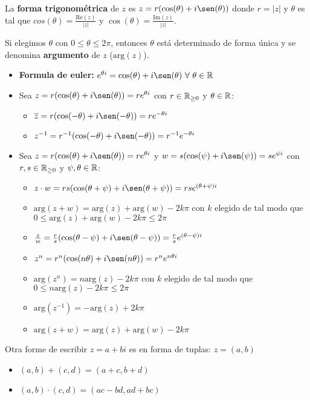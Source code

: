 La \textbf{forma trigonométrica} de $z$ es $\trigform{z}{r}{\theta}$ donde $r=|z|$ y $\theta$ es tal que $cos(\theta)=\frac{\text{Re}(z)}{|z|}$ y $\cos(\theta) = \frac{\text{Im}(z)}{|z|}$.

Si elegimos $\theta$ con $0\leq\theta\leq2\pi$, entonces $\theta$ está determinado de forma \'unica y se denomina \textbf{argumento} de $z$ ($\text{arg}(z)$).

\begin{itemize}
\item \textbf{Formula de euler:} $e^{\theta i} =  \cos(\theta) + i\sen(\theta) ~\forall~\theta\in\reales$
\item Sea $\trigform{z}{r}{\theta} = \eulerform{r}{\theta}$ con $r\in\mathbb{R}_{\geq 0}$ y $\theta\in\mathbb{R}$:
\begin{itemize}
\item $\trigform{\overline{z}}{r}{-\theta} = \eulerform{r}{-\theta}$
\item $\trigform{z^{-1}}{r^{-1}}{-\theta} = \eulerform{r^{-1}}{-\theta}$
\end{itemize}
\item Sea $\trigform{z}{r}{\theta} = \eulerform{r}{\theta}$ y $\trigform{w}{s}{\psi} = \eulerform{s}{\psi}$ con $r,s\in\mathbb{R}_{\geq 0}$ y $\psi,\theta\in\mathbb{R}$:
\begin{itemize}
    \item $\trigform{z\cdot w}{rs}{\theta+\psi} = \eulerform{rs}{(\theta+\psi)}$
    \item $\text{arg}(z+w) = \text{arg}(z) + \text{arg}(w) - 2k\pi$ con $k$ elegido de tal modo que $0\leq\text{arg}(z) + \text{arg}(w) - 2k\pi\leq 2\pi$
    \item $\trigform{\frac{z}{w}}{\frac{r}{s}}{\theta-\psi} = \eulerform{\frac{r}{s}}{(\theta-\psi)}$
    \item $\trigform{z^n}{r^n}{n\theta} = \eulerform{r^n}{n\theta}$
    \item $\text{arg}(z^n) = n\text{arg}(z) - 2k\pi$ con $k$ elegido de tal modo que $0\leq n\text{arg}(z) - 2k\pi\leq 2\pi$
    \item $\text{arg}(z^{-1}) = -\text{arg}(z) + 2k\pi$
    \item $\text{arg}(z+w) = \text{arg}(z) + \text{arg}(w) - 2k\pi$
\end{itemize}
\end{itemize}

Otra forme de escribir $z = a + bi$ es en forma de tuplas: $z=(a,b)$

\begin{itemize}
    \item $(a,b) + (c,d) = (a+c,b+d)$
    \item $(a,b)\cdot(c,d) = (ac-bd,ad+bc)$
\end{itemize}

